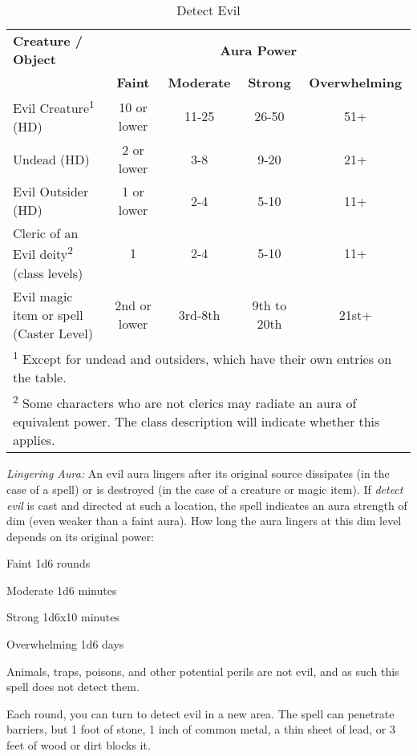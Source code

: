 \begin{table}[htb]
\caption{Detect Evil}
\centering
\begin{tabular}{l c c c c}
\textbf{Creature / Object} & \multicolumn{4}{c}{\textbf{Aura Power}}\\
 & \textbf{Faint} & \textbf{Moderate} & \textbf{Strong} & \textbf{Overwhelming}\\
Evil Creature\textsuperscript{1} (HD) & 10 or lower & 11-25 & 26-50 & 51+\\
Undead (HD) & 2 or lower & 3-8 & 9-20 & 21+\\
Evil Outsider (HD) & 1 or lower & 2-4 & 5-10 & 11+\\
Cleric of an Evil deity\textsuperscript{2} (class levels) & 1 & 2-4 & 5-10 & 11+\\
Evil magic item or spell (Caster Level) & 2nd or lower & 3rd-8th & 9th to 20th & 21st+\\
\multicolumn{5}{p{15cm}}{\textsuperscript{1} Except for undead and outsiders, which have their own entries on the table.}\\
\multicolumn{5}{p{15cm}}{\textsuperscript{2} Some characters who are not clerics may radiate an aura of equivalent power. The class description will indicate whether this applies.}\\
\end{tabular}
\end{table}

\textit{Lingering Aura:} An evil aura lingers after its original source dissipates 
(in the case of a spell) or is destroyed (in the case of a creature or magic item). 
If \textit{detect evil} is cast and directed at such a location, the spell indicates 
an aura strength of dim (even weaker than a faint aura). How long the aura lingers 
at this dim level depends on its original power:

\begin{description*}
\item[Faint] 1d6 rounds
\item[Moderate] 1d6 minutes
\item[Strong] 1d6x10 minutes
\item[Overwhelming] 1d6 days
\end{description*}

Animals, traps, poisons, and other potential perils are not evil, and as such this 
spell does not detect them.

Each round, you can turn to detect evil in a new area. The spell can penetrate 
barriers, but 1 foot of stone, 1 inch of common metal, a thin sheet of lead, or 
3 feet of wood or dirt blocks it.

